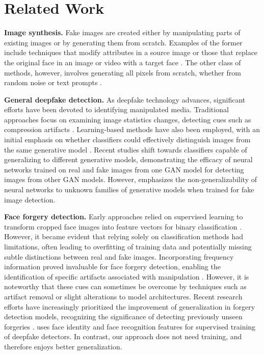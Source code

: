 \documentclass{article} \usepackage{iclr2024_conference,times}
\begin{document}
\section{Related Work}

\textbf{Image synthesis.} Fake images are created either by manipulating parts of existing images or by generating them from scratch. Examples of the former include techniques that modify attributes in a source image or those that replace the original face in an image or video with a target face \citep{faceswap1,faceswap2,faceswap3,faceswap4}. The other class of methods, however, involves generating all pixels from scratch, whether from random noise \citep{stylegan} or text prompts \citep{stable_diffusion,dalle-2,imagen}.

\textbf{General deepfake detection.} As deepfake technology advances, significant efforts have been devoted to identifying manipulated media. Traditional approaches focus on examining image statistics changes, detecting cues such as compression artifacts \citep{compression_artifacts}. Learning-based methods have also been employed, with an initial emphasis on whether classifiers could effectively distinguish images from the same generative model \citep{learning1,learning2_freq,learning3_ff++}. Recent studies \citep{efros_paper,generalization_isola} shift towards classifiers capable of generalizing to different generative models, demonstrating the efficacy of neural networks trained on real and fake images from one GAN model for detecting images from other GAN models. However, \cite{df_knn_paper} emphasizes the non-generalizability of neural networks to unknown families of generative models when trained for fake image detection.

\textbf{Face forgery detection.} Early approaches relied on supervised learning to transform cropped face images into feature vectors for binary classification \citep{face_forgery1_ffd,face_forgery2,learning3_ff++}. However, it became evident that relying solely on classification methods had limitations, often leading to overfitting of training data and potentially missing subtle distinctions between real and fake images. Incorporating frequency information proved invaluable for face forgery detection, enabling the identification of specific artifacts associated with manipulation \citep{learning2_freq,frequency1,high_freq_eccv_2020_f3net,srm_high_freq,spsl_high_freq}. However, it is noteworthy that these cues can sometimes be overcome by techniques such as artifact removal or slight alterations to model architectures. Recent research efforts have increasingly prioritized the improvement of generalization in forgery detection models, recognizing the significance of detecting previously unseen forgeries \citep{generalization1_recce,generalization2,generalization3}. \citet{identity_cvpr23} uses face identity and face recognition features for supervised training of deepfake detectors. In contrast, our approach does not need training, and therefore enjoys better generalization.
\end{document}
